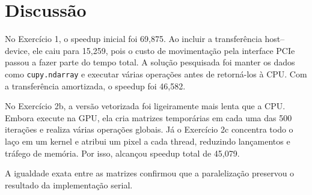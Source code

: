 \section{Discussão}

No Exercício 1, o speedup inicial foi 69,875. Ao incluir a transferência
host--device, ele caiu para 15,259, pois o custo de movimentação pela interface
PCIe passou a fazer parte do tempo total. A solução pesquisada foi manter os
dados como \texttt{cupy.ndarray} e executar várias operações antes de
retorná-los à CPU. Com a transferência amortizada, o speedup foi 46,582.

No Exercício 2b, a versão vetorizada foi ligeiramente mais lenta que a CPU.
Embora execute na GPU, ela cria matrizes temporárias em cada uma das 500
iterações e realiza várias operações globais. Já o Exercício 2c concentra todo
o laço em um kernel e atribui um pixel a cada thread, reduzindo lançamentos e
tráfego de memória. Por isso, alcançou speedup total de 45,079.

A igualdade exata entre as matrizes confirmou que a paralelização preservou o
resultado da implementação serial.
